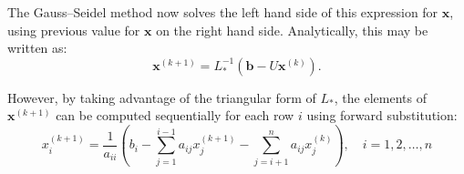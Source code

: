 \documentclass{article}
\begin{document}
The Gauss–Seidel method now solves the left hand side of this expression for $\mathbf{x}$, 
using previous value for $\mathbf{x}$ on the right hand side. Analytically, 
this may be written as:
\[
  \mathbf{x}^{(k+1)} = L_*^{-1} \left(\mathbf{b} - U \mathbf{x}^{(k)}\right).
\]

However, by taking advantage of the triangular form of \(L_{*}\), the elements of 
\(\mathbf {x} ^{(k+1)}\) can be computed sequentially for each row \(i\) using 
forward substitution:
\[
  x^{(k+1)}_i  = \frac{1}{a_{ii}} \left(b_i - \sum_{j=1}^{i-1}a_{ij}x^{(k+1)}_j - \sum_{j=i+1}^{n}a_{ij}x^{(k)}_j \right),\quad i=1,2,\dots,n
\]
\end{document}
